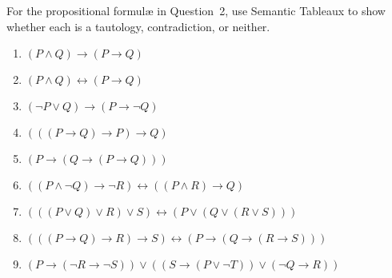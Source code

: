 \documentclass[10.5pt]{article}
\newenvironment{problem}[2][Problem]{\begin{trivlist}
\item[\hskip \labelsep {\bfseries #1}\hskip \labelsep {\bfseries #2.}]}{\end{trivlist}}
\begin{document}
\pagebreak
\pagebreak
\newpage
\clearpage
\begin{problem}{3}
For the propositional formul{\ae} in Question~2, use Semantic Tableaux to show whether each is a tautology, contradiction, or neither.
\begin{enumerate}
  \parskip=0in
  \parsep=0in
  \itemsep=0in
\item $(P \wedge Q) \rightarrow (P \rightarrow Q)$
\item $(P \wedge Q) \leftrightarrow (P \rightarrow Q)$
\item $(\lnot P \vee Q) \rightarrow (P \rightarrow \lnot Q)$
\item $(((P \rightarrow Q) \rightarrow P) \rightarrow Q)$
\item $(P \rightarrow (Q \rightarrow (P \rightarrow Q)))$
\item $((P \wedge \lnot Q) \rightarrow \lnot R) \leftrightarrow ((P \wedge R) \rightarrow Q)$
\item $(((P \vee Q) \vee R) \vee S) \leftrightarrow (P \vee (Q \vee (R \vee S)))$
\item $(((P \rightarrow Q) \rightarrow R) \rightarrow S) \leftrightarrow (P \rightarrow (Q \rightarrow (R \rightarrow S)))$
\item $(P \rightarrow (\lnot R \rightarrow \lnot S)) \vee ((S \rightarrow (P \vee \lnot T)) \vee (\lnot Q \rightarrow R))$
\end{enumerate}
\end{problem}
\end{document}
